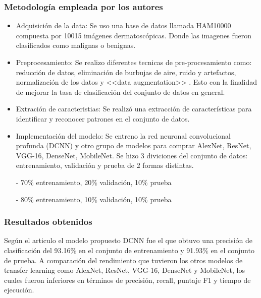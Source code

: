\subsubsection{Metodología empleada por los autores}
\newcommand{\MEone}{ Adquisición de la data: Se uso una base de datos llamada HAM10000 compuesta por 10015 imágenes dermatoscópicas. Donde las imagenes fueron clasificados como malignas o benignas.
}
\newcommand{\MEtwo}{ Preprocesamiento: Se realizo diferentes tecnicas de pre-procesamiento como: reducción de datos, eliminación de burbujas de aire, ruido y artefactos, normalización de los datos y <<data augmentation>> . Esto con la finalidad de mejorar la tasa de clasificación del conjunto de datos en general. 
}

\newcommand{\MEthree}{ Extración de caracteristias: Se realizó una extracción de características para identificar y reconocer patrones en el conjunto de datos. 
}
\newcommand{\MEfour}{Implementación del modelo: Se entreno la red neuronal convolucional profunda (DCNN) y otro grupo de modelos para comprar AlexNet, ResNet, VGG-16, DenseNet, MobileNet.
Se hizo 3 diviciones del conjunto de datos: entrenamiento, validación y prueba de 2 formas distintas.

- 70\% entrenamiento, 20\% validación, 10\% prueba

- 80\% entrenamiento, 10\% validación, 10\% prueba
}


\begin{itemize}
	\item \MEone
	\item \MEtwo
	\item \MEthree
	\item \MEfour

\end{itemize}



\subsubsection{Resultados obtenidos}
Según el articulo el modelo propuesto DCNN fue el que obtuvo una precisión de clasificación del 93.16\% en el conjunto de entrenamiento y 91.93\% en el conjunto de prueba. A comparación del rendimiento que tuvieron los otros modelos de transfer learning como AlexNet, ResNet, VGG-16, DenseNet y MobileNet, los cuales fueron inferiores en términos de precisión, recall, puntaje F1 y tiempo de ejecución.


